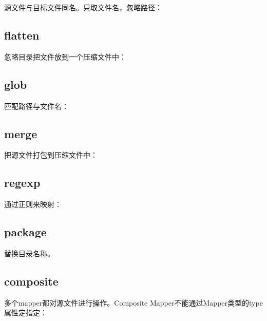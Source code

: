 		源文件与目标文件同名。只取文件名，忽略路径：
		
		

	\subsection{flatten}

		忽略目录把文件放到一个压缩文件中：
		
		

	\subsection{glob}

		匹配路径与文件名：
		
		

	\subsection{merge}

		把源文件打包到压缩文件中：
		
		

	\subsection{regexp}

		通过正则来映射：
		
		

	\subsection{package}

		替换目录名称。
		
		

	\subsection{composite}

		多个mapper都对源文件进行操作。Composite Mapper不能通过Mapper类型的type属性定指定：
		
